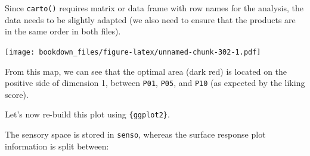 \documentclass[
]{krantz}
\makeatletter
\newenvironment{Shaded}{\begin{snugshade}}{\end{snugshade}}
\newcommand{\AttributeTok}[1]{\textcolor[rgb]{0.61,0.61,0.61}{#1}}
\newcommand{\ConstantTok}[1]{\textcolor[rgb]{0,0,0}{#1}}
\newcommand{\DecValTok}[1]{\textcolor[rgb]{0.06,0.06,0.06}{#1}}
\newcommand{\FunctionTok}[1]{\textcolor[rgb]{0,0,0}{#1}}
\newcommand{\NormalTok}[1]{#1}
\newcommand{\OtherTok}[1]{\textcolor[rgb]{0.37,0.37,0.37}{#1}}
\newcommand{\SpecialCharTok}[1]{\textcolor[rgb]{0,0,0}{#1}}
\newcommand{\StringTok}[1]{\textcolor[rgb]{0.5,0.5,0.5}{#1}}
\newenvironment{kframe}{%
\medskip{}
\setlength{\fboxsep}{.8em}
 \def\at@end@of@kframe{}%
 \ifinner\ifhmode%
  \def\at@end@of@kframe{\end{minipage}}%
  \begin{minipage}{\columnwidth}%
 \fi\fi%
 \def\FrameCommand##1{\hskip\@totalleftmargin \hskip-\fboxsep
 \colorbox{shadecolor}{##1}\hskip-\fboxsep
     \hskip-\linewidth \hskip-\@totalleftmargin \hskip\columnwidth}%
 \MakeFramed {\advance\hsize-\width
   \@totalleftmargin\z@ \linewidth\hsize
   \@setminipage}}%
 {\par\unskip\endMakeFramed%
 \at@end@of@kframe}
\renewenvironment{Shaded}{\begin{kframe}}{\end{kframe}}
\makeatother
\begin{document}
Since \texttt{carto()} requires matrix or data frame with row names for the analysis, the data needs to be slightly adapted (we also need to ensure that the products are in the same order in both files).

\begin{Shaded}
\end{Shaded}

\texttt{[image: bookdown\_files/figure-latex/unnamed-chunk-302-1.pdf]}

From this map, we can see that the optimal area (dark red) is located on the positive side of dimension 1, between \texttt{P01}, \texttt{P05}, and \texttt{P10} (as expected by the liking score).

Let's now re-build this plot using \texttt{\{ggplot2\}}.

The sensory space is stored in \texttt{senso}, whereas the surface response plot information is split between:
\end{document}
